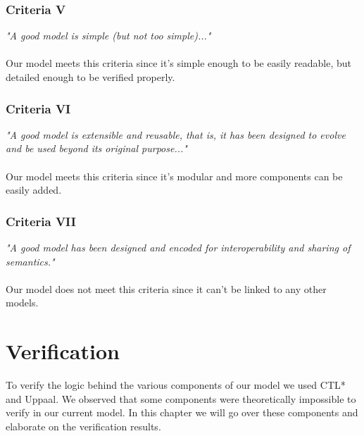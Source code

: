 \documentclass{article}
\begin{document}
         \subsubsection{Criteria V}
            \textit{"A good model is simple (but not too simple)..."} \\\\
            Our model meets this criteria since it's simple enough to be easily readable, but detailed enough to be verified properly.
         
         \subsubsection{Criteria VI}
            \textit{"A good model is extensible and reusable, that is, it has been designed to evolve and be used beyond its original purpose..."}\\\\
            Our model meets this criteria since it's modular and more components can be easily added.
         
         \subsubsection{Criteria VII}
            \textit{"A good model has been designed and encoded for interoperability and sharing of semantics."}\\\\
            Our model does not meet this criteria since it can't be linked to any other models.
         


\newpage
\section{Verification}
    To verify the logic behind the various components of our model we used CTL* and Uppaal. We observed that some components were theoretically impossible to verify in our current model. In this chapter we will go over these components and elaborate on the verification results.
    
\end{document}
